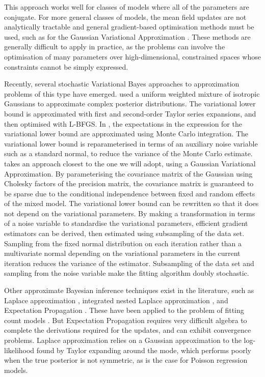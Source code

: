 This approach works well for classes of models where all of the parameters are
conjugate. For more general classes of models, the mean field updates are not
analytically tractable and general gradient-based optimisation methods must be
used, such as for the Gaussian Variational Approximation \citep{Ormerod2012}.
These methods are generally difficult to apply in practice, as the problems can
involve the optimisation of many parameters over high-dimensional, constrained
spaces whose constraints cannot be simply expressed.

Recently, several stochastic Variational Bayes approaches to approximation
problems of this type have emerged.  \cite{Gershman2012} used a uniform
weighted mixture of isotropic Gaussians to approximate complex posterior
distributions. The variational lower bound is approximated with first and
second-order Taylor series expansions, and then optimised with L-BFGS.  In
\cite{Kingma2013}, the expectations in the expression for the variational lower
bound are approximated using Monte Carlo integration. The variational lower
bound is reparameterised in terms of an auxiliary noise variable such as a
standard normal, to reduce the variance of the Monte Carlo estimate.
\cite{Tan2018} takes an approach closest to the one we will adopt, using a
Gaussian Variational Approximation.  By parameterising the covariance matrix of
the Gaussian using Cholesky factors of the precision matrix, the covariance
matrix is guaranteed to be sparse due to the conditional independence between
fixed and random effects of the mixed model. The variational lower bound can be
rewritten so that it does not depend on the variational parameters.  By making
a transformation in terms of a noise variable to standardise the variational
parameters, efficient gradient estimators can be derived, then estimated using
subsampling of the data set. Sampling from the fixed normal distribution on
each iteration rather than a multivariate normal depending on the variational
parameters in the current iteration reduces the variance of the estimator.
Subsampling of the data set and sampling from the noise variable make the
fitting algorithm doubly stochastic.

Other approximate Bayesian inference techniques exist in the literature, such
as Laplace approximation \citep{Tierney1986},   integrated nested Laplace
approximation \citep{Rue2009}, and Expectation Propagation \citep{Minka2013}.
These have been applied to the problem of fitting count models
\citep{Barber2016, KimWand2017}.  But Expectation Propagation requires very
difficult algebra to complete the derivations required for the updates, and can exhibit convergence
problems. Laplace approximation relies on a Gaussian approximation to
the log-likelihood found by Taylor expanding around the mode, which performs
poorly when the true posterior is not symmetric, as is the case for Poisson
regression models.

